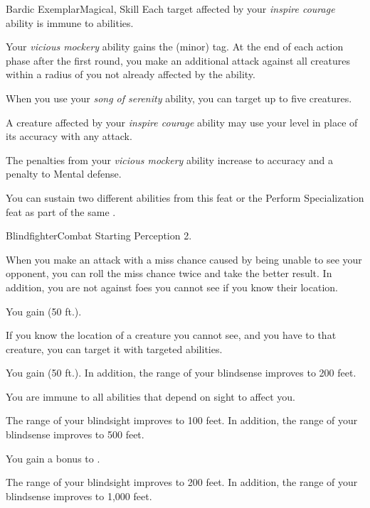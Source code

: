 \begin{feat}{Bardic Exemplar}{Magical, Skill}
         Each target affected by your \textit{inspire courage} ability is immune to  abilities.

         Your \textit{vicious mockery} ability gains the  (minor) tag.
        At the end of each action phase after the first round, you make an additional attack against all creatures within a \areahuge radius of you not already affected by the ability.

         When you use your \textit{song of serenity} ability, you can target up to five creatures.

         A creature affected by your \textit{inspire courage} ability may use your level in place of its accuracy with any attack.

         The penalties from your \textit{vicious mockery} ability increase to  accuracy and a  penalty to Mental defense.

         You can sustain two different  abilities from this feat or the Perform Specialization feat as part of the same .
    \end{feat}

    \begin{feat}{Blindfighter}{Combat}
        \featpre Starting Perception 2.
        
         When you make an attack with a miss chance caused by being unable to see your opponent, you can roll the miss chance twice and take the better result.
        In addition, you are not  against foes you cannot see if you know their location.

         You gain  (50 ft.).

         If you know the location of a creature you cannot see, and you have  to that creature, you can target it with targeted abilities.

         You gain  (50 ft.).
        In addition, the range of your blindsense improves to 200 feet. 

         You are immune to all abilities that depend on sight to affect you.

         The range of your blindsight improves to 100 feet.
        In addition, the range of your blindsense improves to 500 feet.

         You gain a  bonus to .

         The range of your blindsight improves to 200 feet.
        In addition, the range of your blindsense improves to 1,000 feet.
    \end{feat}

